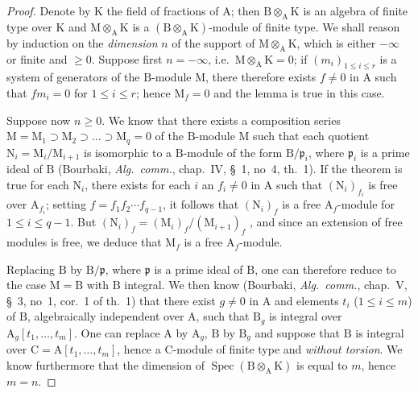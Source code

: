 \begin{proof}
Denote by $\mathrm{K}$ the field of fractions of $\mathrm{A}$; then $\mathrm{B}\otimes_\mathrm{A}\mathrm{K}$ is an algebra of finite type over $\mathrm{K}$ and $\mathrm{M}\otimes_\mathrm{A}\mathrm{K}$ is a $(\mathrm{B}\otimes_\mathrm{A}\mathrm{K})$-module of finite type. We shall reason by induction on the \emph{dimension} $n$ of the support of $\mathrm{M}\otimes_\mathrm{A}\mathrm{K}$, which is either $-\infty$ or finite and $\geqslant 0$. Suppose first $n=-\infty$, i.e.\ $\mathrm{M}\otimes_\mathrm{A}\mathrm{K}=0$; if $(m_i)_{1\leqslant i\leqslant r}$ is a system of generators of the $\mathrm{B}$-module $\mathrm{M}$, there therefore exists $f\neq 0$ in $\mathrm{A}$ such that $fm_i=0$ for $1\leqslant i\leqslant r$; hence $\mathrm{M}_f=0$ and the lemma is true in this case.

Suppose now $n\geqslant 0$. We know that there exists a composition series $\mathrm{M}=\mathrm{M}_1\supset\mathrm{M}_2\supset\ldots\supset\mathrm{M}_q=0$ of the $\mathrm{B}$-module $\mathrm{M}$ such that each quotient $\mathrm{N}_i=\mathrm{M}_i/\mathrm{M}_{i+1}$ is isomorphic to a $\mathrm{B}$-module of the form $\mathrm{B}/\mathfrak{p}_i$, where $\mathfrak{p}_i$ is a prime ideal of $\mathrm{B}$ (Bourbaki, \emph{Alg.\ comm.}, chap.~IV, \S~1, no~4, th.~1). If the theorem is true for each $\mathrm{N}_i$, there exists for each $i$ an $f_i\neq 0$ in $\mathrm{A}$ such that $(\mathrm{N}_i)_{f_i}$ is free over $\mathrm{A}_{f_i}$; setting $f=f_1f_2\cdots f_{q-1}$, it follows that $(\mathrm{N}_i)_f$ is a free $\mathrm{A}_f$-module for $1\leqslant i\leqslant q-1$. But $(\mathrm{N}_i)_f=(\mathrm{M}_i)_f/(\mathrm{M}_{i+1})_f$ , and since an extension of free modules is free, we deduce that $\mathrm{M}_f$ is a free $\mathrm{A}_f$-module.

Replacing $\mathrm{B}$ by $\mathrm{B}/\mathfrak{p}$, where $\mathfrak{p}$ is a prime ideal of $\mathrm{B}$, one can therefore reduce to the case $\mathrm{M}=\mathrm{B}$ with $\mathrm{B}$ integral. We then know (Bourbaki, \emph{Alg.\ comm.}, chap.~V, \S~3, no~1, cor.~1 of th.~1) that there exist $g\neq 0$ in $\mathrm{A}$ and elements $t_i$ ($1\leqslant i\leqslant m$) of $\mathrm{B}$, algebraically independent over $\mathrm{A}$, such that $\mathrm{B}_g$ is integral over $\mathrm{A}_g[t_1,\ldots,t_m]$. One can replace $\mathrm{A}$ by $\mathrm{A}_g$, $\mathrm{B}$ by $\mathrm{B}_g$ and suppose that $\mathrm{B}$ is integral over $\mathrm{C}=\mathrm{A}[t_1,\ldots,t_m]$, hence a $\mathrm{C}$-module of finite type and \emph{without torsion}. We know furthermore  that the dimension of $\operatorname{Spec}(\mathrm{B}\otimes_\mathrm{A}\mathrm{K})$ is equal to $m$, hence $m=n$.


\end{proof}

